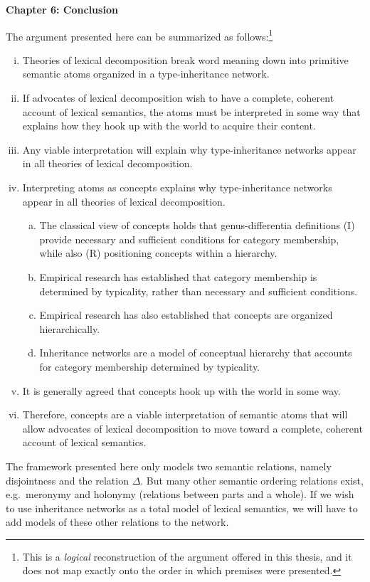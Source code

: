 \begin{center}
\Large \textbf{Chapter 6: Conclusion} \\[1ex]
\end{center} 

The argument presented here can be summarized as follows:\footnote{This is a \emph{logical} reconstruction of the argument offered in this thesis, and it does not map exactly onto the order in which premises were presented.}
\begin{enumerate}[(i)]
\item Theories of lexical decomposition break word meaning down into primitive semantic atoms organized in a type-inheritance network.
\item If advocates of lexical decomposition wish to have a complete, coherent account of lexical semantics, the atoms must be interpreted in some way that explains how they hook up with the world to acquire their content.
\item Any viable interpretation will explain why type-inheritance networks appear in all theories of lexical decomposition.
\item Interpreting atoms as concepts explains why type-inheritance networks appear in all theories of lexical decomposition.
	\begin{enumerate}[(a)]
	\item The classical view of concepts holds that genus-differentia definitions (I) provide necessary and sufficient conditions for category membership, while also (R) positioning concepts within a hierarchy.
	\item Empirical research has established that category membership is determined by typicality, rather than necessary and sufficient conditions.
	\item Empirical research has also established that concepts are organized hierarchically.
	\item Inheritance networks are a model of conceptual hierarchy that accounts for category membership determined by typicality.
	\end{enumerate}
\item It is generally agreed that concepts hook up with the world in some way.
\item Therefore, concepts are a viable interpretation of semantic atoms that will allow advocates of lexical decomposition to move toward a complete, coherent account of lexical semantics.
\end{enumerate}

The framework presented here only models two semantic relations, namely disjointness and the relation $\Delta$. But many other semantic ordering relations exist, e.g.\ meronymy and holonymy (relations between parts and a whole). If we wish to use inheritance networks as a total model of lexical semantics, we will have to add models of these other relations to the network.

